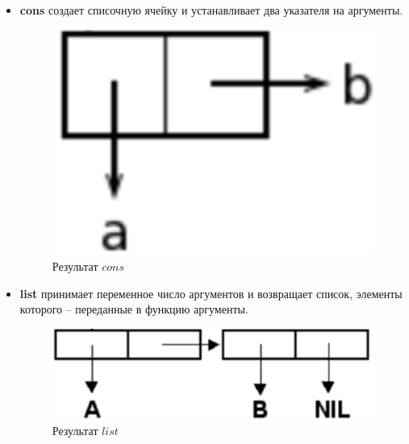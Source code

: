 \documentclass[a4paper,14pt, unknownkeysallowed]{extreport}
\begin{document}
\begin{itemize}
	\item \textbf{cons} создает списочную ячейку и устанавливает два указателя на аргументы.
	
	\begin{figure}[h]
		\centering
		\includegraphics[scale=0.4]{img/picture1.png}
		\caption{Результат $cons$}
		\label{fig:picture1}
	\end{figure} 
	
	\item \textbf{list} принимает переменное число аргументов и возвращает список, элементы которого -- переданные в функцию аргументы.
	
	\begin{figure}[h]
		\centering
		\includegraphics[scale=0.45]{img/picture2.png}
		\caption{Результат $list$}
		\label{fig:picture2}
	\end{figure} 

\end{itemize} 
\end{document}
